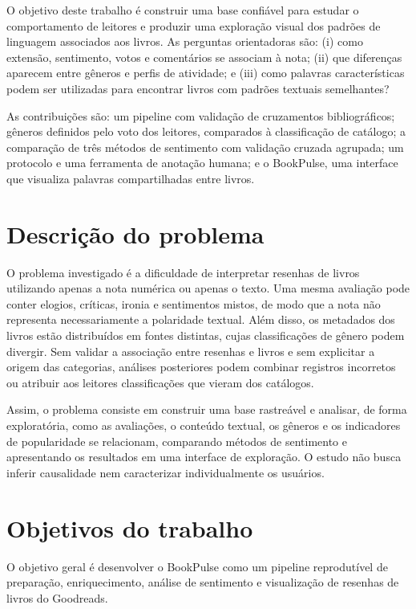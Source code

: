 \documentclass[conference]{IEEEtran}
\begin{document}
O objetivo deste trabalho é construir uma base confiável para estudar o
comportamento de leitores e produzir uma exploração visual dos padrões de
linguagem associados aos livros. As perguntas orientadoras são: (i) como
extensão, sentimento, votos e comentários se associam à nota; (ii) que
diferenças aparecem entre gêneros e perfis de atividade; e (iii) como palavras
características podem ser utilizadas para encontrar livros com padrões textuais
semelhantes?

As contribuições são: um pipeline com validação de cruzamentos bibliográficos;
gêneros definidos pelo voto dos leitores, comparados à classificação de
catálogo; a comparação de três métodos de sentimento com validação cruzada
agrupada; um protocolo e uma ferramenta de anotação humana; e o BookPulse, uma
interface que visualiza palavras compartilhadas entre livros.

\section{Descrição do problema}

O problema investigado é a dificuldade de interpretar resenhas de livros
utilizando apenas a nota numérica ou apenas o texto. Uma mesma avaliação pode
conter elogios, críticas, ironia e sentimentos mistos, de modo que a nota não
representa necessariamente a polaridade textual. Além disso, os metadados dos
livros estão distribuídos em fontes distintas, cujas classificações de gênero
podem divergir. Sem validar a associação entre resenhas e livros e sem explicitar
a origem das categorias, análises posteriores podem combinar registros
incorretos ou atribuir aos leitores classificações que vieram dos catálogos.

Assim, o problema consiste em construir uma base rastreável e analisar, de
forma exploratória, como as avaliações, o conteúdo textual, os gêneros e os
indicadores de popularidade se relacionam, comparando métodos de sentimento e
apresentando os resultados em uma interface de exploração. O estudo não busca
inferir causalidade nem caracterizar individualmente os usuários.

\section{Objetivos do trabalho}

O objetivo geral é desenvolver o BookPulse como um pipeline reprodutível de
preparação, enriquecimento, análise de sentimento e visualização de resenhas de
livros do Goodreads.
\end{document}
